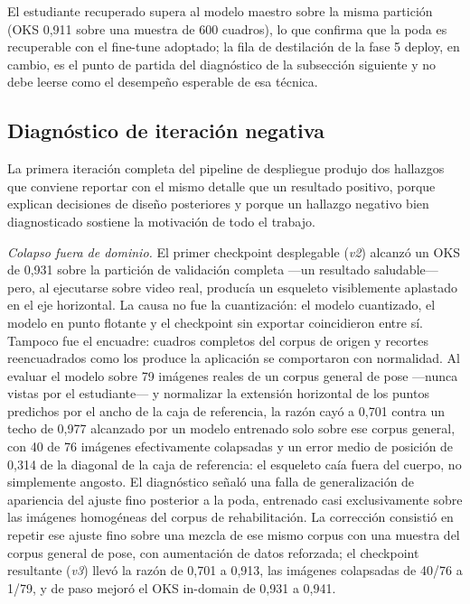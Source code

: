 \documentclass[10pt,a4paper,twocolumn]{article}
\begin{document}
El estudiante recuperado supera al modelo maestro sobre la misma partición
(OKS 0,911 sobre una muestra de 600 cuadros), lo que confirma que la poda es
recuperable con el fine-tune adoptado; la fila de destilación de la fase 5
deploy, en cambio, es el punto de partida del diagnóstico de la subsección
siguiente y no debe leerse como el desempeño esperable de esa técnica.

\subsection{Diagnóstico de iteración negativa}
La primera iteración completa del pipeline de despliegue produjo dos
hallazgos que conviene reportar con el mismo detalle que un resultado
positivo, porque explican decisiones de diseño posteriores y porque un
hallazgo negativo bien diagnosticado sostiene la motivación de todo el
trabajo.

\emph{Colapso fuera de dominio.} El primer checkpoint desplegable (\emph{v2})
alcanzó un OKS de 0,931 sobre la partición de validación completa —un
resultado saludable— pero, al ejecutarse sobre video real, producía un
esqueleto visiblemente aplastado en el eje horizontal. La causa no fue la
cuantización: el modelo cuantizado, el modelo en punto flotante y el
checkpoint sin exportar coincidieron entre sí. Tampoco fue el encuadre:
cuadros completos del corpus de origen y recortes reencuadrados como los
produce la aplicación se comportaron con normalidad. Al evaluar el modelo
sobre 79 imágenes reales de un corpus general de pose —nunca vistas por el
estudiante— y normalizar la extensión horizontal de los puntos predichos por
el ancho de la caja de referencia, la razón cayó a 0,701 contra un techo de
0,977 alcanzado por un modelo entrenado solo sobre ese corpus general, con 40
de 76 imágenes efectivamente colapsadas y un error medio de posición de 0,314
de la diagonal de la caja de referencia: el esqueleto caía fuera del cuerpo,
no simplemente angosto. El diagnóstico señaló una falla de generalización de
apariencia del ajuste fino posterior a la poda, entrenado casi
exclusivamente sobre las imágenes homogéneas del corpus de rehabilitación. La
corrección consistió en repetir ese ajuste fino sobre una mezcla de ese mismo
corpus con una muestra del corpus general de pose, con aumentación de datos
reforzada; el checkpoint resultante (\emph{v3}) llevó la razón de 0,701 a
0,913, las imágenes colapsadas de 40/76 a 1/79, y de paso mejoró el OKS
in-domain de 0,931 a 0,941.
\end{document}
